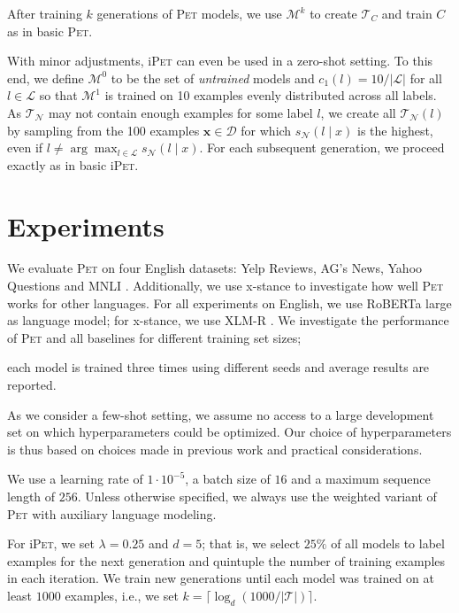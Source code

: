 After training $k$ generations of \textsc{Pet} models, we use $\mathcal{M}^k$ to create $\mathcal{T}_C$ and train $C$ as in basic \textsc{Pet}.

With minor adjustments, i\textsc{Pet} can even be used in a zero-shot setting. To this end, we define $\mathcal{M}^0$ to be the set of \emph{untrained} models and $c_1(l) = {10 / |\mathcal{L}|}$
for all $l \in \mathcal{L}$ so that $\mathcal{M}^1$ is trained on 10 examples evenly distributed across all labels. As $\mathcal{T}_\mathcal{N}$ may not contain enough examples for some label $l$, we create all $\mathcal{T}_\mathcal{N}(l)$ by sampling from the 100 examples $\mathbf{x} \in \mathcal{D}$ for which $s_\mathcal{N}(l \mid x)$ is the highest, even if $l \neq \arg\max_{l \in \mathcal{L}} s_\mathcal{N}(l \mid x)$. For each subsequent generation, we proceed exactly as in basic i\textsc{Pet}.

\section{Experiments}

We evaluate \textsc{Pet} on four English datasets: Yelp Reviews, AG's News, Yahoo Questions \citep{zhang2015character} and MNLI \citep{williams2018mnli}. Additionally, we use x-stance \citep{vamvas2020xstance} to investigate how well \textsc{Pet} works for other languages. For all experiments on English, we use RoBERTa large \citep{liu2019roberta} as language model; for x-stance, we use XLM-R \citep{conneau2019unsupervised}. We investigate the performance of \textsc{Pet} and all baselines for different training set sizes;

each model is trained three times using different seeds and average results are reported.

As we consider a few-shot setting, we assume no access to a large development set on which hyperparameters could be optimized. Our choice of hyperparameters is thus based on choices made in previous work and practical considerations. 

We use a learning rate of $1\cdot10^{-5}$, a batch size of $16$ and a maximum sequence length of $256$. Unless otherwise specified, we always use the weighted variant of \textsc{Pet} with auxiliary language modeling.

For i\textsc{Pet}, we set $\lambda = 0.25$ and $d = 5$; that is, we select $25\%$ of all models to label examples for the next generation and quintuple the number of training examples in each iteration. We train new generations until each model was trained on at least $1000$ examples, i.e., we set $k = \lceil \log_d(1000 / |\mathcal{T}|) \rceil$.


